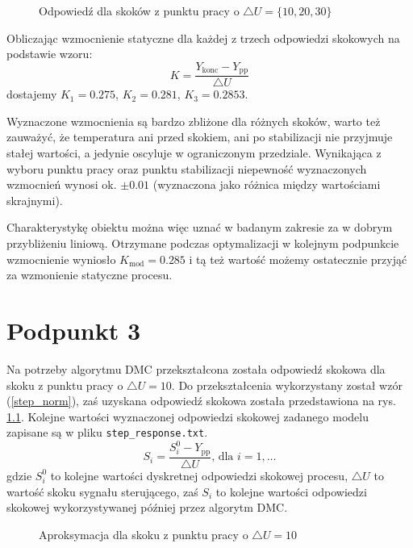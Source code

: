 \begin{figure}[ht]
\centering

\caption{Odpowiedź dla skoków z punktu pracy o $\triangle U = \{10, 20, 30\}$}
\label{R1}
\end{figure}

Obliczając wzmocnienie statyczne dla każdej z trzech odpowiedzi skokowych na podstawie wzoru:
\begin{equation}
 K=\frac{Y_{\mathrm{konc}}-Y_{\mathrm{pp}}}{\triangle U}
 \end{equation}
dostajemy $K_1=\num{0,275}$, $K_2=\num{0,281}$, $K_3=\num{0,2853}$.

Wyznaczone wzmocnienia są bardzo zbliżone dla różnych skoków, warto też zauważyć, że temperatura ani przed skokiem, ani po stabilizacji nie przyjmuje stałej wartości, a jedynie oscyluje w ograniczonym przedziale. Wynikająca z wyboru punktu pracy oraz punktu stabilizacji niepewność wyznaczonych wzmocnień wynosi ok. $\pm \num{0,01}$ (wyznaczona jako różnica między wartościami skrajnymi).

Charakterystykę obiektu można więc uznać w badanym zakresie za w dobrym przybliżeniu liniową. Otrzymane podczas optymalizacji w kolejnym podpunkcie wzmocnienie wyniosło $K_{\mathrm{mod}}=\num{0,285}$ i tą też wartość możemy ostatecznie przyjąć za wzmonienie statyczne procesu.


\chapter{Podpunkt 3}
Na potrzeby algorytmu DMC przekształcona została odpowiedź skokowa dla skoku z punktu pracy o $\triangle U = 10$. Do przekształcenia wykorzystany został wzór (\ref{step_norm}), zaś uzyskana odpowiedź skokowa została przedstawiona na rys. \ref{R2}. Kolejne wartości wyznaczonej odpowiedzi skokowej zadanego modelu zapisane są w pliku \verb+step_response.txt+.
\begin{equation}
S_i = \frac{S_i^0 - Y_{\mathrm{pp}}}{\triangle U} \textrm{, dla } i=1,\ldots
\label{step_norm}
\end{equation}
gdzie $S_i^0$ to kolejne wartości dyskretnej odpowiedzi skokowej procesu, $\triangle U$ to wartość skoku sygnału sterującego, zaś $S_i$ to kolejne wartości odpowiedzi skokowej wykorzystywanej później przez algorytm DMC.

\begin{figure}[ht]
\centering

\caption{Aproksymacja dla skoku z punktu pracy o $\triangle U = 10$}
\label{R2}
\end{figure}

